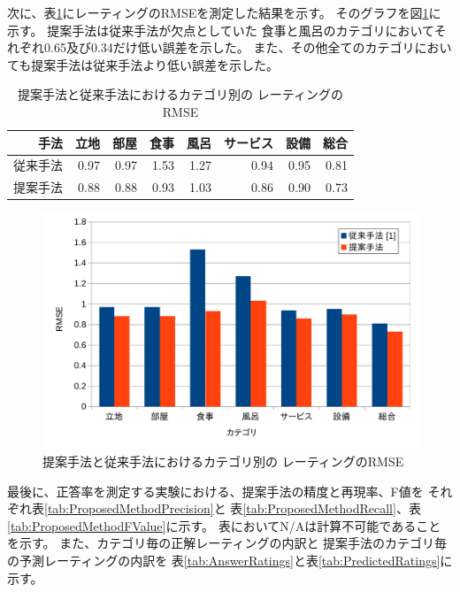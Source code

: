 次に、表\ref{tab:RMSEsPerCategory}にレーティングのRMSEを測定した結果を示す。
そのグラフを図\ref{fig:RMSEsPerCategory}に示す。
提案手法は従来手法が欠点としていた
食事と風呂のカテゴリにおいてそれぞれ0.65及び0.34だけ低い誤差を示した。
また、その他全てのカテゴリにおいても提案手法は従来手法より低い誤差を示した。

\begin{table}
  \caption{提案手法と従来手法\cite{fujitani15}におけるカテゴリ別の
           レーティングのRMSE}
  \centering
  \begin{tabular}{r | r r r r r r r} \label{tab:RMSEsPerCategory}
    手法 & 立地 & 部屋 & 食事 & 風呂 & サービス & 設備 & 総合 \\
    \hline
    従来手法\cite{fujitani15}
        & 0.97 & 0.97 & 1.53 & 1.27 & 0.94 & 0.95 & 0.81 \\
    提案手法 & 0.88 & 0.88 & 0.93 & 1.03 & 0.86 & 0.90 & 0.73 \\
  \end{tabular}
\end{table}

\begin{figure}
  \includegraphics{fig/graph_of_rmses_per_category.pdf}
  \caption{提案手法と従来手法\cite{fujitani15}におけるカテゴリ別の
           レーティングのRMSE}
  \label{fig:RMSEsPerCategory}
\end{figure}

最後に、正答率を測定する実験における、提案手法の精度と再現率、F値を
それぞれ表\ref{tab:ProposedMethodPrecision}と
表\ref{tab:ProposedMethodRecall}、表\ref{tab:ProposedMethodFValue}に示す。
表においてN/Aは計算不可能であることを示す。
また、カテゴリ毎の正解レーティングの内訳と
提案手法のカテゴリ毎の予測レーティングの内訳を
表\ref{tab:AnswerRatings}と表\ref{tab:PredictedRatings}に示す。


